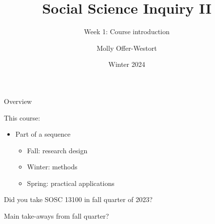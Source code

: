 \documentclass[xcolor={dvipsnames}, handout]{beamer}
\title{Social Science Inquiry II}
\subtitle{Week 1: Course introduction}
\date{Winter 2024}
\author{Molly Offer-Westort}
\institute{Department of Political Science, \\University of Chicago}
\begin{document}


\frame{\titlepage
\thispagestyle{empty}
}
\begin{frame}{Overview}

This course:\pause
\begin{itemize}
\item Part of a sequence \pause
\begin{itemize}
\item Fall: research design \pause
\item Winter: methods \pause
\item Spring: practical applications
\end{itemize}
\end{itemize}

\pause

Did you take SOSC 13100 in fall quarter of 2023?

\end{frame}



\begin{frame}

\begin{center}
Main take-aways from fall quarter?
\end{center}

\end{frame}



\end{document}
